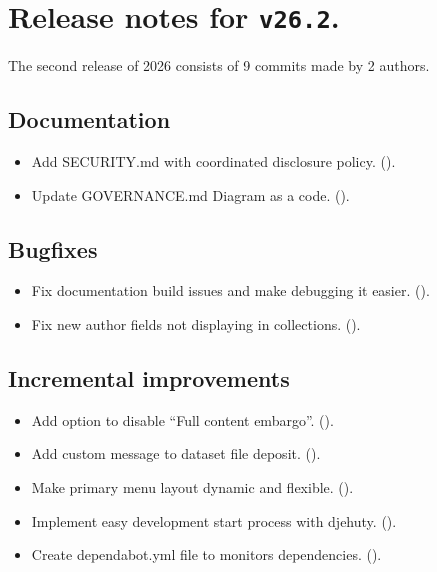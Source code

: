 \section*{Release notes for \texttt{v26.2}.}

  The second release of 2026 consists of 9 commits made by 2 authors.

\subsection*{Documentation}
\begin{itemize}
\item{Add SECURITY.md with coordinated disclosure policy.
    ().}
\item{Update GOVERNANCE.md Diagram as a code.
    ().}
\end{itemize}

\subsection*{Bugfixes}
\begin{itemize}
\item{Fix documentation build issues and make debugging it easier.
    ().}
\item{Fix new author fields not displaying in collections.
    ().}
\end{itemize}

\subsection*{Incremental improvements}
\begin{itemize}
\item{Add option to disable “Full content embargo”.
    ().}
\item{Add custom message to dataset file deposit.
    ().}
\item{Make primary menu layout dynamic and flexible.
    ().}
\item{Implement easy development start process with djehuty.
    ().}
\item{Create dependabot.yml file to monitors dependencies.
    ().}
\end{itemize}

